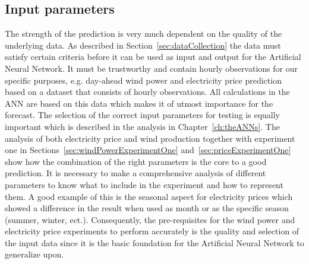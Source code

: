 \subsection{Input parameters}
The strength of the prediction is very much dependent on the quality of the underlying data. As described in Section~\ref{sec:dataCollection} the data must satisfy certain criteria before it can be used as input and output for the Artificial Neural Network. It must be trustworthy and contain hourly observations for our specific purposes, e.g. day-ahead wind power and electricity price prediction based on a dataset that consists of hourly observations. All calculations in the ANN are based on this data which makes it of utmost importance for the forecast. The selection of the correct input parameters for testing is equally important which is described in the analysis in Chapter~\ref{ch:theANNs}. The analysis of both electricity price and wind production together with experiment one in Sections~\ref{sec:windPowerExperimentOne} and~\ref{sec:priceExperimentOne} show how the combination of the right parameters is the core to a good prediction. It is necessary to make a comprehensive analysis of different parameters to know what to include in the experiment and how to represent them. A good example of this is the seasonal aspect for electricity prices which showed a difference in the result when used as month or as the specific season (summer, winter, ect.). Consequently, the pre-requisites for the wind power and electricity price experiments to perform accurately is the quality and selection of the input data since it is the basic foundation for the Artificial Neural Network to generalize upon.

